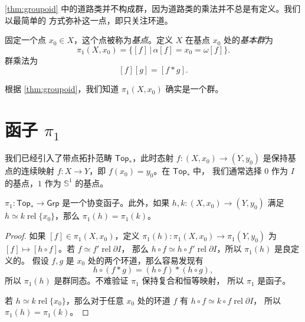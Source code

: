 \documentclass[fontset=none]{Notes}
\DeclareMathOperator\rel{rel}
\newcommand{\cat}[1]{\mathsf{#1}}
\newcommand{\partI}{\partial I}
\newcommand{\relhomo}{\rel\partI}
\begin{document}
\autoref{thm:groupoid} 中的道路类并不构成群，因为道路类的乘法并不总是有定义。我们以最简单的
方式弥补这一点，即只关注环道。

\begin{definition}
  固定一个点 $x_0\in X$，这个点被称为\emph{基点}。定义 $X$ 在基点 $x_0$ 处的\emph{基本群}为
  \[
    \pi_1(X,x_0)=\bigl\{[f]\,|\,\alpha[f]=x_0=\omega[f]\bigr\}.
  \]
  群乘法为
  \[
    [f][g]=[f*g].
  \]
\end{definition}

根据 \autoref{thm:groupoid}，我们知道 $\pi_1(X,x_0)$ 确实是一个群。


\section{函子 \texorpdfstring{$\pi_1$}{pi}}

我们已经引入了带点拓扑范畴 $\cat{Top_*}$，此时态射 $f:(X,x_0)\to (Y,y_0)$
是保持基点的连续映射 $f:X\to Y$，即 $f(x_0)=y_0$。在 $\cat{Top_*}$ 中，
我们通常选择 $0$ 作为 $I$ 的基点，$1$ 作为 $\mathbb{S}^1$ 的基点。

\begin{theorem}
  $\pi_1:\cat{Top_*}\to\cat{Grp}$ 是一个协变函子。此外，如果 $h,k:(X,x_0)\to (Y,y_0)$
  满足 $h\simeq k\rel\{x_0\}$，那么 $\pi_1(h)=\pi_1(k)$。
\end{theorem}
\begin{proof}
  如果 $[f]\in \pi_1(X,x_0)$，定义 $\pi_1(h):\pi_1(X,x_0)\to \pi_1(Y,y_0)$
  为 $[f]\mapsto [h\circ f]$。若 $f\simeq f'\relhomo$，
  那么 $h\circ f\simeq h\circ f'\relhomo$，所以 $\pi_1(h)$ 是良定义的。
  假设 $f,g$ 是 $x_0$ 处的两个环道，那么容易发现有
  \[
    h\circ (f*g)=(h\circ f)*(h\circ g),
  \]
  所以 $\pi_1(h)$ 是群同态。不难验证 $\pi_1$ 保持复合和恒等映射，
  所以 $\pi_1$ 是函子。

  若 $h\simeq k\rel\{x_0\}$，那么对于任意 $x_0$ 处的环道 $f$ 有 $h\circ f\simeq k\circ f\relhomo$，
  所以 $\pi_1(h)=\pi_1(k)$。
\end{proof}
\end{document}
